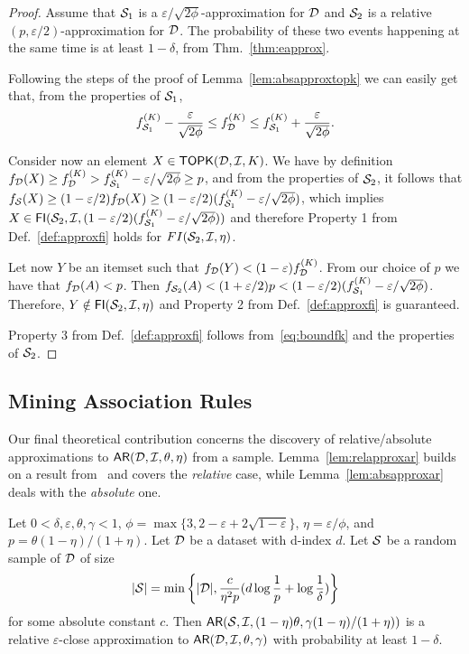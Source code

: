 \begin{proof}
  Assume that ${\cal S}_1$ is a $\varepsilon/\sqrt{2\phi}$-approximation for
  ${\cal D}$ and ${\cal S}_2$ is a relative $(p,\varepsilon/2)$-approximation for ${\cal D}$.
  The probability of these two events happening at the same time is at least
  $1-\delta$, from Thm.~\ref{thm:eapprox}.

  Following the steps of the proof of Lemma~\ref{lem:absapproxtopk} we can
  easily get that, from the properties of ${\cal S}_1$,
  \begin{equation}\label{eq:boundfk}
    f_{{\cal S}_1}^{(K)}-\frac{\varepsilon}{\sqrt{2\phi}}\le f_{\cal D}^{(K)}\le
    f_{{\cal S}_1}^{(K)}+\frac{\varepsilon}{\sqrt{2\phi}}.
  \end{equation}

  Consider now an element $X\in\mathsf{TOPK}({\cal D},{\cal I},K)$. We have by definition
  $f_{\cal D}(X)\ge f_{\cal D}^{(K)} > f_{{\cal S}_1}^{(K)}-\varepsilon/\sqrt{2\phi}\ge
  p$, and from the properties of ${\cal S}_2$, it follows that $f_{\cal S}(X)\ge
  (1-\varepsilon/2)f_{\cal D}(X)\ge(1-\varepsilon/2)(f_{{\cal S}_1}^{(K)}-\varepsilon/\sqrt{2\phi})$,
  which implies
  $X\in\mathsf{FI}({\cal S}_2,{\cal I},(1-\varepsilon/2)(f_{{\cal S}_1}^{(K)}-\varepsilon/\sqrt{2\phi}))$
  and therefore Property 1 from Def.~\ref{def:approxfi} holds for
  $FI({\cal S}_2,{\cal I},\eta)$.
 
  Let now $Y$ be an itemset such that $f_{\cal D}(Y)<(1-\varepsilon)f_{\cal D}^{(K)}$.
  From our choice of $p$ we have that $f_{\cal D}(A)< p$. Then
  $f_{{\cal S}_2}(A)<(1+\varepsilon/2)p<(1-\varepsilon/2)(f_{{\cal S}_1}^{(K)}-\varepsilon/\sqrt{2\phi})$.
  Therefore, $Y\notin\mathsf{FI}({\cal S}_2,{\cal I},\eta)$ and Property 2 from
  Def.~\ref{def:approxfi} is guaranteed.

  Property 3 from Def.~\ref{def:approxfi} follows from~\eqref{eq:boundfk} and
  the properties of ${\cal S}_2$.
\end{proof}

\subsection{Mining Association Rules}\label{sec:miningar}
Our final theoretical contribution concerns the discovery of relative/absolute
approximations to $\mathsf{AR}({\cal D},{\cal I},\theta,\eta)$ from a sample.
Lemma~\ref{lem:relapproxar} builds on a result
from~\cite[Sect.~5]{ChakaravarthyPS09} and covers the \emph{relative} case,
while Lemma~\ref{lem:absapproxar} deals with the \emph{absolute} one.

\begin{lemma}\label{lem:relapproxar}
  Let $0<\delta,\varepsilon,\theta,\gamma<1$,
  $\phi=\max\{3,2-\varepsilon+2\sqrt{1-\varepsilon}\}$,
  $\eta=\varepsilon/\phi$, and $p=\theta(1-\eta)/(1+\eta)$. Let
  ${\cal D}$ be a dataset with d-index $d$.
  Let ${\cal S}$ be a random sample of ${\cal D}$ of size 
  \[
  |{\cal S}|=\min\left\{|{\cal D}|,\frac{c}{\eta^2p}(d\log\frac{1}{p}+\log\frac{1}{\delta})\right\}\]
  for some absolute constant $c$. Then
  $\mathsf{AR}({\cal S},{\cal I},(1-\eta)\theta,\gamma(1-\eta)/(1+\eta))$
  is a relative $\varepsilon$-close approximation to
  $\mathsf{AR}({\cal D},{\cal I},\theta,\gamma)$ with probability at least $1-\delta$.
\end{lemma}

